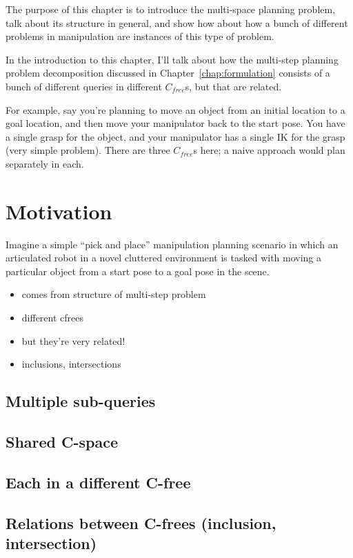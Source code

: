 \documentclass{report}
\begin{document}
The purpose of this chapter is to introduce the multi-space planning
problem,
talk about its structure in general,
and show how about how a bunch of different problems in manipulation
are instances of this type of problem.

In the introduction to this chapter,
I'll talk about how the multi-step planning problem decomposition
discussed in Chapter~\ref{chap:formulation}
consists of a bunch of different queries in different
$C_{free}$s, but that are related.

For example, say you're planning to move an object from an initial
location to a goal location,
and then move your manipulator back to the start pose.
You have a single grasp for the object,
and your manipulator has a single IK for the grasp (very simple problem).
There are three $C_{free}$s here;
a naive approach would plan separately in each.

\section{Motivation}

Imagine a simple ``pick and place'' manipulation planning scenario
in which an articulated robot in a novel cluttered environment
is tasked with moving a particular object from a start pose to a goal
pose in the scene.

\begin{itemize}
\item comes from structure of multi-step problem
\item different cfrees
\item but they're very related!
\item inclusions, intersections
\end{itemize}

\subsection{Multiple sub-queries}

\subsection{Shared C-space}

\subsection{Each in a different C-free}

\subsection{Relations between C-frees (inclusion, intersection)}
\end{document}
